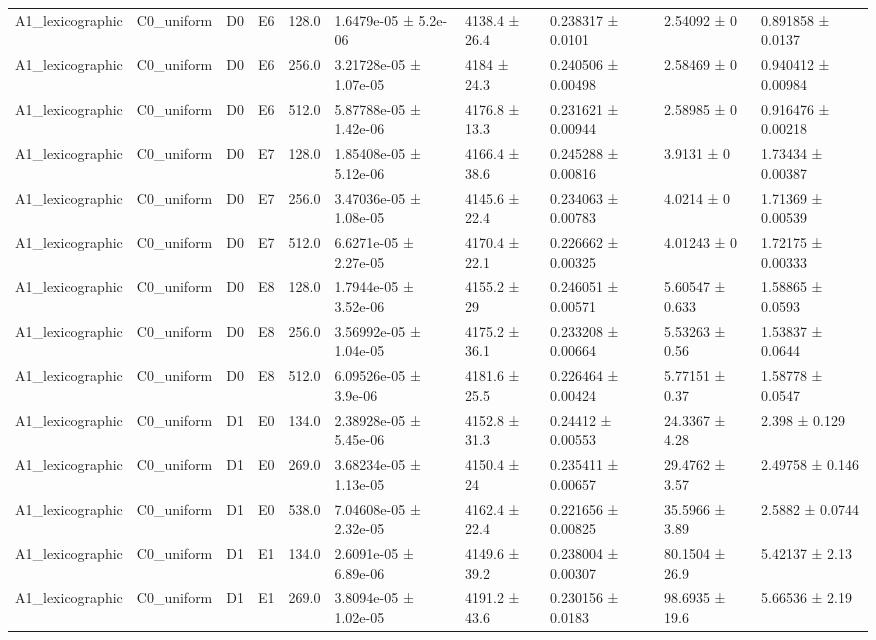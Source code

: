 \begin{table}
\begin{tabular}{llllllllll}
A1\_lexicographic & C0\_uniform & D0 & E6 & 128.0 & 1.6479e-05 ± 5.2e-06 & 4138.4 ± 26.4 & 0.238317 ± 0.0101 & 2.54092 ± 0 & 0.891858 ± 0.0137 \\
A1\_lexicographic & C0\_uniform & D0 & E6 & 256.0 & 3.21728e-05 ± 1.07e-05 & 4184 ± 24.3 & 0.240506 ± 0.00498 & 2.58469 ± 0 & 0.940412 ± 0.00984 \\
A1\_lexicographic & C0\_uniform & D0 & E6 & 512.0 & 5.87788e-05 ± 1.42e-06 & 4176.8 ± 13.3 & 0.231621 ± 0.00944 & 2.58985 ± 0 & 0.916476 ± 0.00218 \\
A1\_lexicographic & C0\_uniform & D0 & E7 & 128.0 & 1.85408e-05 ± 5.12e-06 & 4166.4 ± 38.6 & 0.245288 ± 0.00816 & 3.9131 ± 0 & 1.73434 ± 0.00387 \\
A1\_lexicographic & C0\_uniform & D0 & E7 & 256.0 & 3.47036e-05 ± 1.08e-05 & 4145.6 ± 22.4 & 0.234063 ± 0.00783 & 4.0214 ± 0 & 1.71369 ± 0.00539 \\
A1\_lexicographic & C0\_uniform & D0 & E7 & 512.0 & 6.6271e-05 ± 2.27e-05 & 4170.4 ± 22.1 & 0.226662 ± 0.00325 & 4.01243 ± 0 & 1.72175 ± 0.00333 \\
A1\_lexicographic & C0\_uniform & D0 & E8 & 128.0 & 1.7944e-05 ± 3.52e-06 & 4155.2 ± 29 & 0.246051 ± 0.00571 & 5.60547 ± 0.633 & 1.58865 ± 0.0593 \\
A1\_lexicographic & C0\_uniform & D0 & E8 & 256.0 & 3.56992e-05 ± 1.04e-05 & 4175.2 ± 36.1 & 0.233208 ± 0.00664 & 5.53263 ± 0.56 & 1.53837 ± 0.0644 \\
A1\_lexicographic & C0\_uniform & D0 & E8 & 512.0 & 6.09526e-05 ± 3.9e-06 & 4181.6 ± 25.5 & 0.226464 ± 0.00424 & 5.77151 ± 0.37 & 1.58778 ± 0.0547 \\
A1\_lexicographic & C0\_uniform & D1 & E0 & 134.0 & 2.38928e-05 ± 5.45e-06 & 4152.8 ± 31.3 & 0.24412 ± 0.00553 & 24.3367 ± 4.28 & 2.398 ± 0.129 \\
A1\_lexicographic & C0\_uniform & D1 & E0 & 269.0 & 3.68234e-05 ± 1.13e-05 & 4150.4 ± 24 & 0.235411 ± 0.00657 & 29.4762 ± 3.57 & 2.49758 ± 0.146 \\
A1\_lexicographic & C0\_uniform & D1 & E0 & 538.0 & 7.04608e-05 ± 2.32e-05 & 4162.4 ± 22.4 & 0.221656 ± 0.00825 & 35.5966 ± 3.89 & 2.5882 ± 0.0744 \\
A1\_lexicographic & C0\_uniform & D1 & E1 & 134.0 & 2.6091e-05 ± 6.89e-06 & 4149.6 ± 39.2 & 0.238004 ± 0.00307 & 80.1504 ± 26.9 & 5.42137 ± 2.13 \\
A1\_lexicographic & C0\_uniform & D1 & E1 & 269.0 & 3.8094e-05 ± 1.02e-05 & 4191.2 ± 43.6 & 0.230156 ± 0.0183 & 98.6935 ± 19.6 & 5.66536 ± 2.19 \\

\end{tabular}
\end{table}
